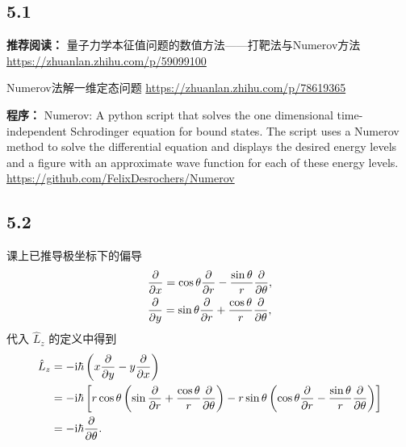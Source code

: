 \subsection{5.1}

\textbf{推荐阅读：}
量子力学本征值问题的数值方法——打靶法与Numerov方法 \url{https://zhuanlan.zhihu.com/p/59099100}

Numerov法解一维定态问题 \url{https://zhuanlan.zhihu.com/p/78619365}

\textbf{程序：}
Numerov: 
A python script that solves the one dimensional time-independent Schrodinger equation for bound states. The script uses a Numerov method to solve the differential equation and displays the desired energy levels and a figure with an approximate wave function for each of these energy levels.
\url{https://github.com/FelixDesrochers/Numerov}

\subsection{5.2}
课上已推导极坐标下的偏导
\begin{align}
    &\pdv{x} = \cos\theta\pdv{r} - \frac{\sin\theta}r \pdv\theta , \\
    &\pdv{y} = \sin\theta\pdv{r} + \frac{\cos\theta}r \pdv\theta,
\end{align}
代入 $\hat L_z$ 的定义中得到
\begin{align}
    \hat L_z &= -\mathrm{i}\hbar \left(x\pdv{y} - y\pdv{x}\right)\\
    &=-\mathrm{i}\hbar \left[
        r\cos\theta \left(
            \sin\pdv{r} + \frac{\cos\theta}r \pdv\theta
        \right)
        - r\sin\theta \left(
            \cos\theta\pdv{r} - \frac{\sin\theta}r \pdv\theta
        \right)
    \right] \notag\\
    &= -\mathrm{i}\hbar \pdv\theta. 
\end{align}
